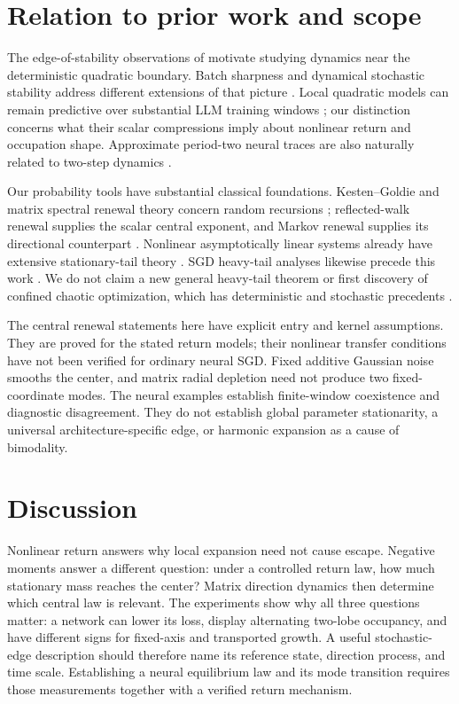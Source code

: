 \section{Relation to prior work and scope}
The edge-of-stability observations of \citet{cohen2021gradient} motivate studying dynamics near the deterministic quadratic boundary. Batch sharpness and dynamical stochastic stability address different extensions of that picture \citep{andreyev2025stochastic,chemnitzengel2025stability}. Local quadratic models can remain predictive over substantial LLM training windows \citep{meterez2026defense}; our distinction concerns what their scalar compressions imply about nonlinear return and occupation shape. Approximate period-two neural traces are also naturally related to two-step dynamics \citep{chenbruna2023twostep}.

Our probability tools have substantial classical foundations. Kesten--Goldie and matrix spectral renewal theory concern random recursions \citep{kesten1973random,goldie1991implicit,guivarchlepage2016}; reflected-walk renewal supplies the scalar central exponent, and Markov renewal supplies its directional counterpart \citep{alsmeyer1997}. Nonlinear asymptotically linear systems already have extensive stationary-tail theory \citep{alsmeyer2016tail,alsmeyer2023asymptotic}. SGD heavy-tail analyses likewise precede this work \citep{gurbuzbalaban2021heavy,damek2026sgd}. We do not claim a new general heavy-tail theorem or first discovery of confined chaotic optimization, which has deterministic and stochastic precedents \citep{chen2023stability,tuci2026generalization,kalle2022random}.

The central renewal statements here have explicit entry and kernel assumptions. They are proved for the stated return models; their nonlinear transfer conditions have not been verified for ordinary neural SGD. Fixed additive Gaussian noise smooths the center, and matrix radial depletion need not produce two fixed-coordinate modes. The neural examples establish finite-window coexistence and diagnostic disagreement. They do not establish global parameter stationarity, a universal architecture-specific edge, or harmonic expansion as a cause of bimodality.

\section{Discussion}
Nonlinear return answers why local expansion need not cause escape. Negative moments answer a different question: under a controlled return law, how much stationary mass reaches the center? Matrix direction dynamics then determine which central law is relevant. The experiments show why all three questions matter: a network can lower its loss, display alternating two-lobe occupancy, and have different signs for fixed-axis and transported growth. A useful stochastic-edge description should therefore name its reference state, direction process, and time scale. Establishing a neural equilibrium law and its mode transition requires those measurements together with a verified return mechanism.

